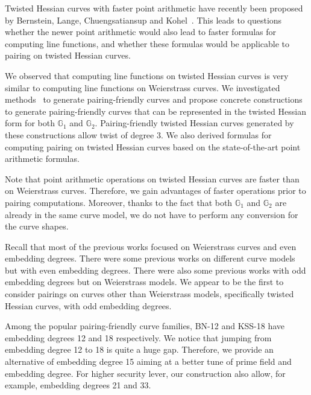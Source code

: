 Twisted Hessian curves with faster point arithmetic have recently been proposed by
Bernstein, Lange, Chuengsatiansup and Kohel~\cite{2015/hessian}.
This leads to questions whether the newer point arithmetic would also lead to faster formulas for computing line functions,
and whether these formulas would be applicable to pairing on twisted Hessian curves.

We observed that computing line functions on twisted Hessian curves is very similar to computing line functions on Weierstrass curves.
We investigated methods~\cite{2010/freeman} to generate pairing-friendly curves
and propose concrete constructions to generate pairing-friendly curves
that can be represented in the twisted Hessian form for both $\mathbb{G}_1$ and $\mathbb{G}_2$.
Pairing-friendly twisted Hessian curves generated by these constructions allow twist of degree 3.
We also derived formulas for computing pairing on twisted Hessian curves based on the state-of-the-art point arithmetic formulas.

Note that point arithmetic operations on twisted Hessian curves are faster than on Weierstrass curves.
Therefore, we gain advantages of faster operations prior to pairing computations.
Moreover, thanks to the fact that both $\mathbb{G}_1$ and $\mathbb{G}_2$ are already in the same curve model,
we do not have to perform any conversion for the curve shapes.

Recall that most of the previous works focused on Weierstrass curves and even embedding degrees.
There were some previous works on different curve models but with even embedding degrees.
There were also some previous works with odd embedding degrees but on Weierstrass models.
We appear to be the first to consider pairings on curves other than Weierstrass models,
specifically twisted Hessian curves, with odd embedding degrees.

Among the popular pairing-friendly curve families,
BN-12 and KSS-18 have embedding degrees 12 and 18 respectively.
We notice that jumping from embedding degree 12 to 18 is quite a huge gap.
Therefore, we provide an alternative of embedding degree 15 aiming at a better tune of prime field and embedding degree.
For higher security lever, our construction also allow, for example, embedding degrees 21 and 33.


%
%

%
